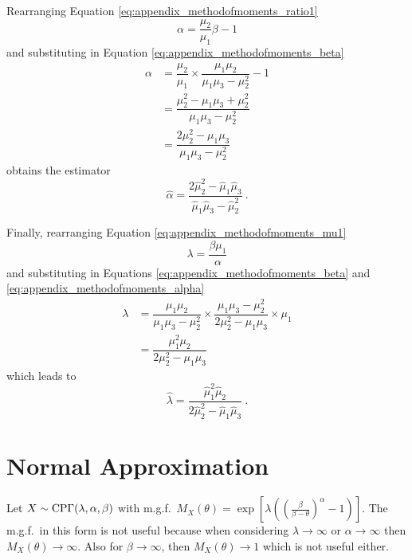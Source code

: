Rearranging Equation \eqref{eq:appendix_methodofmoments_ratio1}
\begin{equation}
\alpha=\dfrac{\mu_2}{\mu_1}\beta - 1
\end{equation}
and substituting in Equation \eqref{eq:appendix_methodofmoments_beta}
\begin{align}
  \alpha &= \dfrac{\mu_2}{\mu_1}\times\dfrac{\mu_1\mu_2}{\mu_1\mu_3-\mu_2^2} - 1
  \nonumber \\
  & = \dfrac{\mu_2^2 - \mu_1\mu_3+\mu_2^2}{\mu_1\mu_3-\mu_2^2}
  \nonumber \\
  & = \dfrac{2\mu_2^2 - \mu_1\mu_3}{\mu_1\mu_3-\mu_2^2}
  \label{eq:appendix_methodofmoments_alpha}
\end{align}
obtains the estimator
\begin{equation}
  \widehat{\alpha} = 
  \dfrac{2\widehat{\mu}_2^2 - \widehat{\mu}_1\widehat{\mu}_3}{\widehat{\mu}_1\widehat{\mu}_3-\widehat{\mu}_2^2} \ .
\end{equation}

Finally, rearranging Equation \eqref{eq:appendix_methodofmoments_mu1}
\begin{equation*}
\lambda = \dfrac{\beta\mu_1}{\alpha}
\end{equation*}
and substituting in Equations \eqref{eq:appendix_methodofmoments_beta} and \eqref{eq:appendix_methodofmoments_alpha}
\begin{align}
\lambda &= 
  \dfrac{\mu_1\mu_2}{\mu_1\mu_3-\mu_2^2}
  \times
  \dfrac{\mu_1\mu_3-\mu_2^2}{2\mu_2^2 - \mu_1\mu_3}
  \times
  \mu_1
  \nonumber \\
  & = \dfrac{\mu_1^2\mu_2}{2\mu_2^2-\mu_1\mu_3}
\end{align}
which leads to
\begin{equation}
\widehat{\lambda} = \dfrac{\widehat{\mu}_1^2\widehat{\mu}_2}{2\widehat{\mu}_2^2-\widehat{\mu}_1\widehat{\mu}_3} \ .
\end{equation}

\section{Normal Approximation}
\label{chapter:appendix_normalApproximation}
Let $X\sim\operatorname{CP\Gamma}(\lambda,\alpha,\beta)$ with m.g.f.~$M_X(\theta)=\exp\left[\lambda\left(\left(\frac{\beta}{\beta-\theta}\right)^{\alpha}-1\right)\right]$. The m.g.f.~in this form is not useful because when considering $\lambda\rightarrow\infty$ or $\alpha\rightarrow\infty$ then $M_X(\theta)\rightarrow\infty$. Also for $\beta\rightarrow\infty$, then $M_X(\theta)\rightarrow 1$ which is not useful either.

